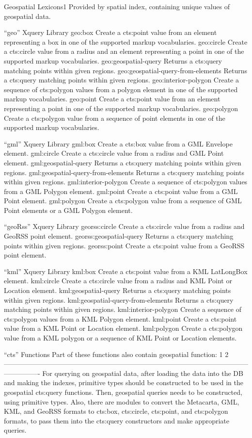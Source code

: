 Geospatial Lexicons1
Provided by spatial index, containing unique values of  geospatial data. 

“geo” Xquery Library
geo:box
Create a cts:point value from an element representing a box in one of the supported markup vocabularies.
geo:circle
Create a cts:circle value from a radius and an element representing a point in one of the supported markup vocabularies.
geo:geospatial-query
Returns a cts:query matching points within given regions.
geo:geospatial-query-from-elements
Returns a cts:query matching points within given regions.
geo:interior-polygon
Create a sequence of cts:polygon values from a polygon element in one of the supported markup vocabularies.
geo:point
Create a cts:point value from an element representing a point in one of the supported markup vocabularies.
geo:polygon
Create a cts:polygon value from a sequence of point elements in one of the supported markup vocabularies.


“gml” Xquery Library
gml:box
Create a cts:box value from a GML Envelope element.
gml:circle
Create a cts:circle value from a radius and GML Point element.
gml:geospatial-query
Returns a cts:query matching points within given regions.
gml:geospatial-query-from-elements
Returns a cts:query matching points within given regions.
gml:interior-polygon
Create a sequence of cts:polygon values from a GML Polygon element.
gml:point
Create a cts:point value from a GML Point element.
gml:polygon
Create a cts:polygon value from a sequence of GML Point elements or a GML Polygon element.


“geoRss” Xquery Library
georss:circle
Create a cts:circle value from a radius and GeoRSS point element.
georss:geospatial-query
Returns a cts:query matching points within given regions.
georss:point
Create a cts:point value from a GeoRSS point element.

“kml” Xquery Library
kml:box
Create a cts:point value from a KML LatLongBox element.
kml:circle
Create a cts:circle value from a radius and KML Point or Location element.
kml:geospatial-query
Returns a cts:query matching points within given regions.
kml:geospatial-query-from-elements
Returns a cts:query matching points within given regions.
kml:interior-polygon
Create a sequence of cts:polygon values from a KML Polygon element.
kml:point
Create a cts:point value from a KML Point or Location element.
kml:polygon
Create a cts:polygon value from a KML polygon or a sequence of KML Point or Location elements.


“cts” Functions
Part of these functions also contain geospatial function: 1 2
----------------------------------------------------------------------------------------------------------------------------
For querying on geospatial data, after loading the data into the DB and making the indexes, primitive types should be constructed to be used in the geospatial cts:query functions. Then, geospatial queries needs to be constructed, using primitive types. 
Also, there are modules to convert the Metacarta, GML, KML, and GeoRSS formats to cts:box, cts:circle, cts:point, and cts:polygon formats, to pass them into the cts:query constructors and make appropriate queries.


